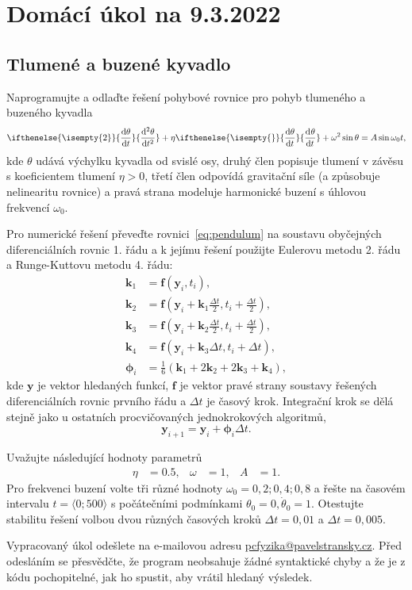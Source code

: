 \documentclass[a4paper,11pt,twoside]{article}
\def\vector#1{\boldsymbol{#1}}								%
\renewcommand{\d}{\mathrm{d}}
\newcommand{\derivative}[3][]{\ifthenelse{\isempty{#1}}	    %
	{\frac{\d{#2}}{\d{#3}}}
	{\frac{\d^{#1}{#2}}{\d{#3}^{#1}}}
}
\def\c{,\!}
\begin{document}
\section*{Domácí úkol na 9.3.2022}
\subsection*{Tlumené a buzené kyvadlo}
Naprogramujte a odlaďte řešení pohybové rovnice pro pohyb tlumeného a buzeného kyvadla
\begin{equation}
    \label{eq:pendulum}
    \derivative[2]{\theta}{t}+\eta\derivative{\theta}{t}+\omega^{2}\sin{\theta}=A\sin\omega_{0}t,
\end{equation}
kde $\theta$ udává výchylku kyvadla od svislé osy, druhý člen popisuje tlumení v závěsu s koeficientem tlumení $\eta>0$, třetí člen odpovídá gravitační síle (a způsobuje nelinearitu rovnice) a pravá strana modeluje harmonické buzení s úhlovou frekvencí $\omega_0$.

Pro numerické řešení převeďte rovnici~\eqref{eq:pendulum} na soustavu obyčejných diferenciálních rovnic 1. řádu a k jejímu řešení použijte Eulerovu metodu 2. řádu a Runge-Kuttovu metodu 4. řádu:
\begin{align*}
    \vector{k}_{1}&=\vector{f}(\vector{y}_{i},t_{i}),\\
    \vector{k}_{2}&=\vector{f}\left(\vector{y}_{i}+\vector{k}_{1}\frac{\Delta t}{2},t_{i}+\frac{\Delta t}{2}\right),\\
    \vector{k}_{3}&=\vector{f}\left(\vector{y}_{i}+\vector{k}_{2}\frac{\Delta t}{2},t_{i}+\frac{\Delta t}{2}\right),\\
    \vector{k}_{4}&=\vector{f}\left(\vector{y}_{i}+\vector{k}_{3}\Delta t,t_{i}+\Delta t\right),\\
    \vector{\phi}_{i}&=\frac{1}{6}\left(\vector{k}_{1}+2\vector{k}_{2}+2\vector{k}_{3}+\vector{k}_{4}\right),
\end{align*}
kde $\vector{y}$ je vektor hledaných funkcí, $\vector{f}$ je vektor pravé strany soustavy řešených diferenciálních rovnic prvního řádu a $\Delta t$ je časový krok.
Integrační krok se dělá stejně jako u ostatních procvičovaných jednokrokových algoritmů,
\begin{equation*}
    \vector{y}_{i+1}=\vector{y}_{i}+\vector{\phi}_{i}\Delta t.
\end{equation*}

Uvažujte následující hodnoty parametrů
\begin{align*}
    \eta&=0.5,
    &\omega&=1,
    &A&=1.
\end{align*}
Pro frekvenci buzení volte tři různé hodnoty $\omega_0=0\c2;0\c4;0\c8$ a řešte na časovém intervalu $t=\langle0;500\rangle$ s počátečními podmínkami $\theta_0=0,\dot{\theta}_{0}=1$.
Otestujte stabilitu řešení volbou dvou různých časových kroků $\Delta t=0\c01$ a $\Delta t=0\c005$.

Vypracovaný úkol odešlete na e-mailovou adresu \href{mailto:pcfyzika@pavelstransky.cz}{pcfyzika@pavelstransky.cz}.
Před odesláním se přesvědčte, že program neobsahuje žádné syntaktické chyby a že je z kódu pochopitelné, jak ho spustit, aby vrátil hledaný výsledek.
\end{document}
